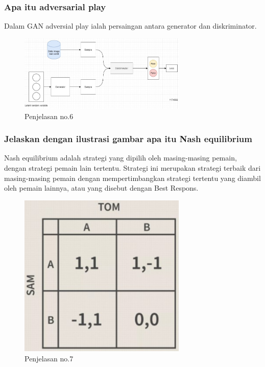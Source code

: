 \subsubsection{Apa itu adversarial play}
\hfill\break
Dalam GAN adversial play ialah persaingan antara generator dan diskriminator.
\begin{figure}[H]
	\centering
	\includegraphics[width=8cm]{figures/1174066/8/6.jpg}
	\caption{Penjelasan no.6}
\end{figure}

\subsubsection{Jelaskan dengan ilustrasi gambar apa itu Nash equilibrium}
\hfill\break
Nash equilibrium adalah strategi yang dipilih oleh masing-masing pemain, dengan strategi pemain lain tertentu.  Strategi ini merupakan strategi terbaik dari masing-masing pemain dengan mempertimbangkan strategi tertentu yang diambil oleh pemain lainnya, atau yang disebut dengan Best Respons.
\begin{figure}[H]
	\centering
	\includegraphics[width=8cm]{figures/1174066/8/7.jpg}
	\caption{Penjelasan no.7}
\end{figure}

